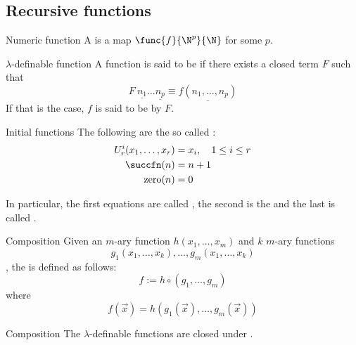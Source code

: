 \documentclass[a4paper, 12pt]{report}
\begin{document}
    \subsection{Recursive functions}

    \begin{frameddefn}{Numeric function}
        A  is a map $\func{f}{\N^p}{\N}$ for some $p$.
    \end{frameddefn}

    \begin{frameddefn}{$\lambda$-definable function}
        A function is said to be  if there exists a closed term $F$ such that $$F \ \underline{n_1} \ldots \underline{n_p} \equiv \underline{f(n_1, \ldots, n_p)}$$ If that is the case, $f$ is said to be  by $F$.
    \end{frameddefn}

    \begin{frameddefn}{Initial functions}
        The following are the so called :
        \begin{equation*}
            \begin{split}
                U_r^i(x_1, \ldots, x_r) &= x_i, \quad 1 \le i \le r \\
                \succfn(n) &= n + 1 \\
                \mathrm{zero}(n) &= 0
            \end{split}
        \end{equation*}
    \end{frameddefn}

    In particular, the first equations are called , the second is the  and the last is called .

    \begin{frameddefn}{Composition}
        Given an $m$-ary function $h(x_1, \ldots, x_m)$ and $k$ $m$-ary functions $$g_1(x_1, \ldots, x_k), \ldots, g_m(x_1, \ldots, x_k)$$, the  is defined as follows: $$f := h \circ (g_1, \ldots, g_m)$$ where $$f(\vec x) = h(g_1(\vec x), \ldots, g_m(\vec x))$$
    \end{frameddefn}

    \begin{framedlem}[label={lem:composition}]{Composition}
        The $\lambda$-definable functions are closed under .
    \end{framedlem}
\end{document}
